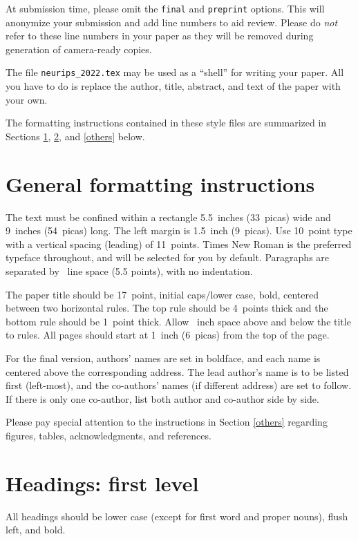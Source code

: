 \documentclass{article}
\begin{document}
At submission time, please omit the \verb+final+ and \verb+preprint+ options.
This will anonymize your submission and add line numbers to aid review. Please
do \emph{not} refer to these line numbers in your paper as they will be removed
during generation of camera-ready copies.

The file \verb+neurips_2022.tex+ may be used as a ``shell'' for writing your
paper. All you have to do is replace the author, title, abstract, and text of
the paper with your own.

The formatting instructions contained in these style files are summarized in
Sections \ref{gen_inst}, \ref{headings}, and \ref{others} below.

\section{General formatting instructions}
\label{gen_inst}

The text must be confined within a rectangle 5.5~inches (33~picas) wide and
9~inches (54~picas) long. The left margin is 1.5~inch (9~picas). Use 10~point
type with a vertical spacing (leading) of 11~points. Times New Roman is the
preferred typeface throughout, and will be selected for you by default.
Paragraphs are separated by ~line space (5.5 points), with no
indentation.

The paper title should be 17~point, initial caps/lower case, bold, centered
between two horizontal rules. The top rule should be 4~points thick and the
bottom rule should be 1~point thick. Allow ~inch space above and
below the title to rules. All pages should start at 1~inch (6~picas) from the
top of the page.

For the final version, authors' names are set in boldface, and each name is
centered above the corresponding address. The lead author's name is to be
listed first (left-most), and the co-authors' names (if different address) are
set to follow. If there is only one co-author, list both author and co-author
side by side.

Please pay special attention to the instructions in Section \ref{others}
regarding figures, tables, acknowledgments, and references.

\section{Headings: first level}
\label{headings}

All headings should be lower case (except for first word and proper nouns),
flush left, and bold.
\end{document}
